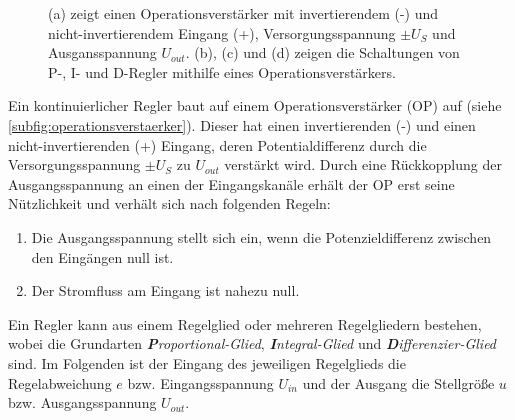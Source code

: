 \begin{figure}[h]
{{{	    	}
	}}
	\caption[Operationsverstärker, Regler]{(a) zeigt einen Operationsverstärker
	mit invertierendem (-) und nicht-invertierendem
	Eingang (+), Versorgungsspannung $\pm U_S$ und
	Ausgansspannung $U_{out}$. (b), (c) und (d) zeigen die Schaltungen von
	P-, I- und D-Regler mithilfe eines
	Operationsverstärkers.}\label{fig:operationsverstaerker}
\end{figure}
Ein kontinuierlicher Regler baut auf einem Operationsverstärker (OP) auf (siehe
\ref{subfig:operationsverstaerker}). Dieser hat einen invertierenden (-) und
einen nicht-invertierenden (+) Eingang, deren Potentialdifferenz durch die
Versorgungsspannung $\pm U_S$ zu $U_{out}$ verstärkt wird. Durch eine
Rückkopplung der Ausgangsspannung an einen der Eingangskanäle erhält der OP erst
seine Nützlichkeit und verhält sich nach folgenden Regeln:
\begin{enumerate}
       \item Die Ausgangsspannung stellt sich ein, wenn die Potenzieldifferenz
       zwischen den Eingängen null ist.
       \item Der Stromfluss am Eingang ist nahezu null.
\end{enumerate}
Ein Regler kann aus einem Regelglied oder mehreren Regelgliedern bestehen, wobei
die Grundarten \textit{\textbf{P}roportional-Glied}, \textit{\textbf{I}ntegral-Glied} und
\textit{\textbf{D}ifferenzier-Glied} sind. Im Folgenden ist der Eingang des
jeweiligen Regelglieds die Regelabweichung $e$ bzw. Eingangsspannung $U_{in}$
und der Ausgang die Stellgröße $u$ bzw. Ausgangsspannung $U_{out}$.

